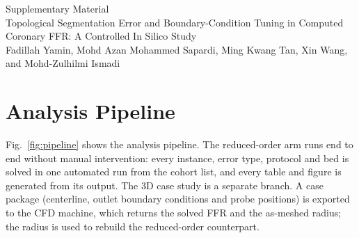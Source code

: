 \documentclass[journal,twoside,web,onecolumn]{ieeecolor}
\begin{document}
\sloppy
\pagestyle{plain}
\begin{center}
{\large Supplementary Material}\\[3pt]
{\small Topological Segmentation Error and Boundary-Condition Tuning in Computed Coronary FFR: A Controlled In Silico Study}\\[2pt]
{\footnotesize Fadillah Yamin, Mohd Azan Mohammed Sapardi, Ming Kwang Tan, Xin Wang, and Mohd-Zulhilmi Ismadi}
\end{center}
\vspace{2pt}

\section{Analysis Pipeline}
Fig.~\ref{fig:pipeline} shows the analysis pipeline. The reduced-order arm
runs end to end without manual intervention: every instance, error type, protocol and bed is solved in one automated run
from the cohort list, and every table and figure is generated from its output. The 3D case study is a separate
branch. A case package (centerline, outlet boundary conditions and probe positions) is exported to the CFD machine,
which returns the solved FFR and the as-meshed radius; the radius is used to rebuild the reduced-order counterpart.
\end{document}
